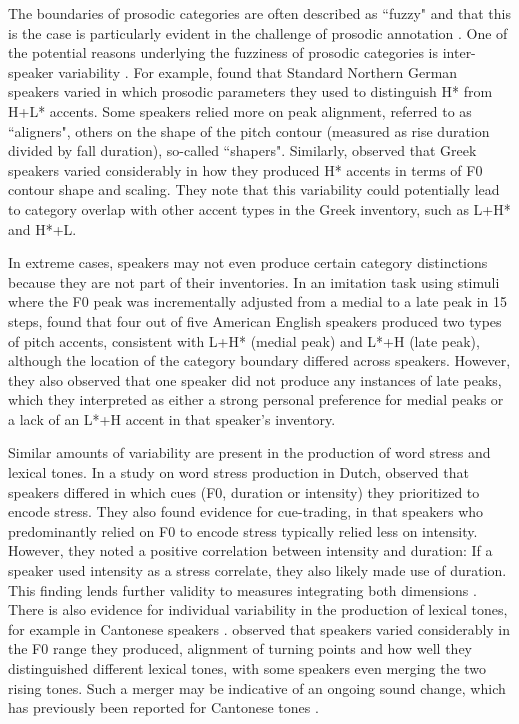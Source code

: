 The boundaries of prosodic categories are often described as ``fuzzy" and that this is the case is particularly evident in the challenge of prosodic annotation \citep[e.g.,][]{coleNewMethodsProsodic2016}. One of the potential reasons underlying the fuzziness of prosodic categories is inter-speaker variability \citep[e.g.,][]{zahner-ritterThreeKindsRisingFalling2022}. For example, \citet{niebuhrAreThereShapers2011} found that Standard Northern German speakers varied in which prosodic parameters they used to distinguish H* from H+L* accents. Some speakers relied more on peak alignment, referred to as ``aligners", others on the shape of the pitch contour (measured as rise duration divided by fall duration), so-called ``shapers".  Similarly, \citet{grylliaManyShapes2022} observed that Greek speakers varied considerably in how they produced H* accents in terms of F0 contour shape and scaling. They note that this variability could potentially lead to category overlap with other accent types in the Greek inventory, such as L+H* and H*+L.

In extreme cases, speakers may not even produce certain category distinctions because they are not part of their inventories. In an imitation task using stimuli where the F0 peak was incrementally adjusted from a medial to a late peak in 15 steps, \citet{pierrehumbertCategoriesTonalAlignment1989} found that four out of five American English speakers produced two types of pitch accents, consistent with L+H* (medial peak) and L*+H (late peak), although the location of the category boundary differed across speakers. However, they also observed that one speaker did not produce any instances of late peaks, which they interpreted as either a strong personal preference for medial peaks or a lack of an L*+H accent in that speaker's inventory. 

Similar amounts of variability are present in the production of word stress and lexical tones. In a study on word stress production in Dutch, \citet{severijnenYourVOORnaamNot2024} observed that speakers differed in which cues (F0, duration or intensity) they prioritized to encode stress. They also found evidence for cue-trading, in that speakers who predominantly relied on F0 to encode stress typically relied less on intensity. However, they noted a positive correlation between intensity and duration: If a speaker used intensity as a stress correlate, they also likely made use of duration. This finding lends further validity to measures integrating both dimensions \citep{beckmanStressNonStressAccent1986, albertModelSonorityBased2023}. There is also evidence for individual variability in the production of lexical tones, for example in Cantonese speakers \citep{wongPerceptualNormalizationInter2003, chanSpeakerVariabilityRealisation2016}. \citet{chanSpeakerVariabilityRealisation2016} observed that speakers varied considerably in the F0 range they produced, alignment of turning points and how well they distinguished different lexical tones, with some speakers even merging the two rising tones. Such a merger may be indicative of an ongoing sound change, which has previously been reported for Cantonese tones \citep{mokProductionPerceptionSound2013}.

